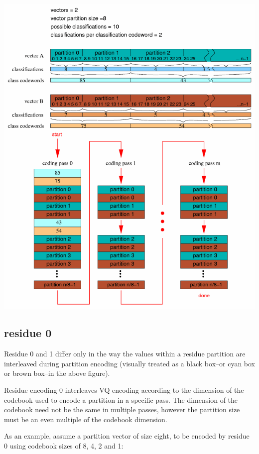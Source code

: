 \begin{center}
\includegraphics[width=\textwidth]{residue-pack}
\end{center}



\subsection{residue 0}

Residue 0 and 1 differ only in the way the values within a residue
partition are interleaved during partition encoding (visually treated
as a black box--or cyan box or brown box--in the above figure).

Residue encoding 0 interleaves VQ encoding according to the
dimension of the codebook used to encode a partition in a specific
pass.  The dimension of the codebook need not be the same in multiple
passes, however the partition size must be an even multiple of the
codebook dimension.

As an example, assume a partition vector of size eight, to be encoded
by residue 0 using codebook sizes of 8, 4, 2 and 1:

